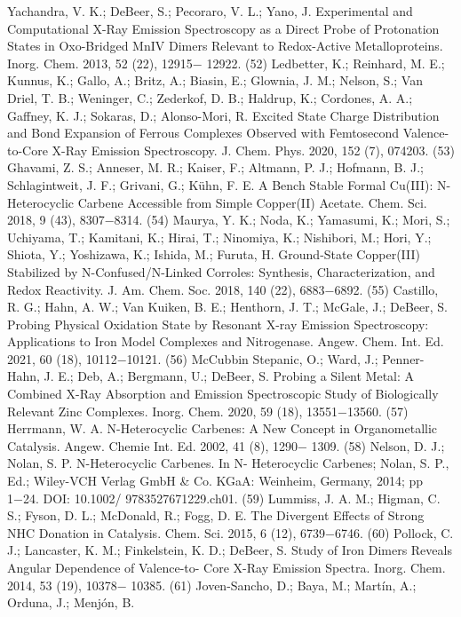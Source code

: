 \documentclass{article}
\begin{document}
Yachandra, V. K.; DeBeer, S.; Pecoraro, V. L.; Yano, J. Experimental
and Computational X-Ray Emission Spectroscopy as a Direct Probe
of Protonation States in Oxo-Bridged MnIV Dimers Relevant to
Redox-Active Metalloproteins. Inorg. Chem. 2013, 52 (22), 12915−
12922.
(52) Ledbetter, K.; Reinhard, M. E.; Kunnus, K.; Gallo, A.; Britz, A.;
Biasin, E.; Glownia, J. M.; Nelson, S.; Van Driel, T. B.; Weninger, C.;
Zederkof, D. B.; Haldrup, K.; Cordones, A. A.; Gaffney, K. J.; Sokaras,
D.; Alonso-Mori, R. Excited State Charge Distribution and Bond
Expansion of Ferrous Complexes Observed with Femtosecond
Valence-to-Core X-Ray Emission Spectroscopy. J. Chem. Phys. 2020,
152 (7), 074203.
(53) Ghavami, Z. S.; Anneser, M. R.; Kaiser, F.; Altmann, P. J.;
Hofmann, B. J.; Schlagintweit, J. F.; Grivani, G.; Kühn, F. E. A Bench
Stable Formal Cu(III): N-Heterocyclic Carbene Accessible from
Simple Copper(II) Acetate. Chem. Sci. 2018, 9 (43), 8307−8314.
(54) Maurya, Y. K.; Noda, K.; Yamasumi, K.; Mori, S.; Uchiyama,
T.; Kamitani, K.; Hirai, T.; Ninomiya, K.; Nishibori, M.; Hori, Y.;
Shiota, Y.; Yoshizawa, K.; Ishida, M.; Furuta, H. Ground-State
Copper(III) Stabilized by N-Confused/N-Linked Corroles: Synthesis,
Characterization, and Redox Reactivity. J. Am. Chem. Soc. 2018, 140
(22), 6883−6892.
(55) Castillo, R. G.; Hahn, A. W.; Van Kuiken, B. E.; Henthorn, J.
T.; McGale, J.; DeBeer, S. Probing Physical Oxidation State by
Resonant X-ray Emission Spectroscopy: Applications to Iron Model
Complexes and Nitrogenase. Angew. Chem. Int. Ed. 2021, 60 (18),
10112−10121.
(56) McCubbin Stepanic, O.; Ward, J.; Penner-Hahn, J. E.; Deb, A.;
Bergmann, U.; DeBeer, S. Probing a Silent Metal: A Combined X-Ray
Absorption and Emission Spectroscopic Study of Biologically
Relevant Zinc Complexes. Inorg. Chem. 2020, 59 (18), 13551−13560.
(57) Herrmann, W. A. N-Heterocyclic Carbenes: A New Concept in
Organometallic Catalysis. Angew. Chemie Int. Ed. 2002, 41 (8), 1290−
1309.
(58) Nelson, D. J.; Nolan, S. P. N-Heterocyclic Carbenes. In N-
Heterocyclic Carbenes; Nolan, S. P., Ed.; Wiley-VCH Verlag GmbH \&
Co. KGaA: Weinheim, Germany, 2014; pp 1−24. DOI: 10.1002/
9783527671229.ch01.
(59) Lummiss, J. A. M.; Higman, C. S.; Fyson, D. L.; McDonald, R.;
Fogg, D. E. The Divergent Effects of Strong NHC Donation in
Catalysis. Chem. Sci. 2015, 6 (12), 6739−6746.
(60) Pollock, C. J.; Lancaster, K. M.; Finkelstein, K. D.; DeBeer, S.
Study of Iron Dimers Reveals Angular Dependence of Valence-to-
Core X-Ray Emission Spectra. Inorg. Chem. 2014, 53 (19), 10378−
10385.
(61) Joven-Sancho, D.; Baya, M.; Martín, A.; Orduna, J.; Menjón, B.
\end{document}
